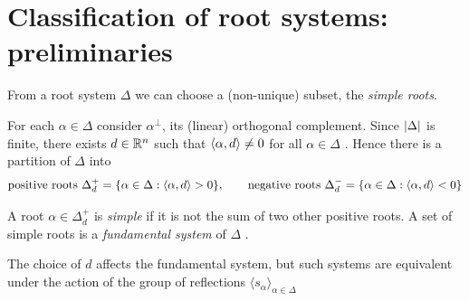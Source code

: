 \section{Classification of root systems: preliminaries}
\label{L04a:sec:4.3}

From a root system $\Delta$ we can choose a (non-unique) subset, the \emph{simple roots}.

For each $\alpha\in\Delta$ consider $\alpha^\perp$, its (linear) orthogonal complement.
Since $\left\lvert \Delta \right\rvert$ is finite, there exists $d\in\mathbb{R}^n$ such that $\langle \alpha, d\rangle\neq0$ for all
$\alpha\in\Delta$ . Hence there is a
partition of $\Delta$ into
\[
  \text{positive roots } \Delta_d^+ = \{\alpha\in\Delta : \langle \alpha, d\rangle>0\},\qquad
  \text{negative roots } \Delta_d^- = \{\alpha\in\Delta : \langle \alpha, d\rangle<0\}
\]

\begin{definition}\label{L04a:def:simple}
A root $\alpha\in\Delta_d^+$ is \emph{simple} if it is not the sum of two other positive roots.
A set of simple roots is a \emph{fundamental system} of $\Delta$ .
\end{definition}

\begin{center}
\end{center}

The choice of $d$ affects the fundamental system, but such systems are equivalent under the action of
the group of reflections $\langle s_\alpha\rangle_{\alpha\in\Delta}$

